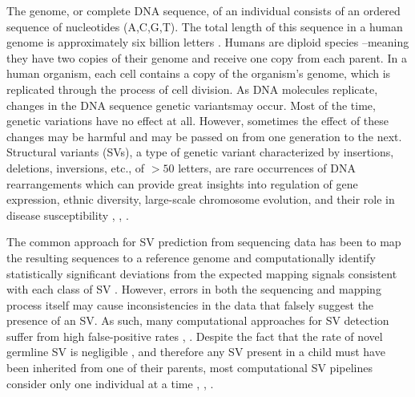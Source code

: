	The genome, or complete DNA sequence, of an individual consists of an ordered sequence of nucleotides (A,C,G,T). The total length of this sequence in a human genome is approximately six billion letters \cite{pevsner2015bioinformatics}. Humans are diploid species --meaning they have two copies of their genome and receive one copy from each parent. In a human organism, each cell contains a copy of the organism's genome, which is replicated through the process of cell division. As DNA molecules replicate, changes in the DNA sequence \textemdash genetic variants\textemdash  may occur. Most of the time, genetic variations have no effect at all. However, sometimes the effect of these changes may be harmful and may be passed on from one generation to the next. Structural variants (SVs), a type of genetic variant characterized by insertions, deletions, inversions, etc., of $>50$ letters,  are rare occurrences of DNA rearrangements which can provide great insights into regulation of gene expression, ethnic diversity, large-scale chromosome evolution, and their role in disease susceptibility \cite{pevsner2015bioinformatics}, \cite{SPENCE202061}, \cite{kosugi2019comprehensive}. 
	
	The common approach for SV prediction from sequencing data has been to map the resulting sequences to a reference genome and computationally identify statistically significant deviations from the expected mapping signals consistent with each class of SV \cite{lander1988genomic}. However, errors in both the sequencing and mapping process itself may cause inconsistencies in the data that falsely suggest the presence of an SV. As such, many computational approaches for SV detection suffer from high false-positive rates  \cite{lander1988genomic}, \cite{medvedev2009computational}. Despite the fact that the rate of novel germline SV is negligible \cite{genome2014whole}, and therefore any SV present in a child must have been inherited from one of their parents, most computational SV pipelines consider only one individual at a time \cite{chen2009breakdancer}, \cite{rausch2012delly}, \cite{quinlan2010genome}.

